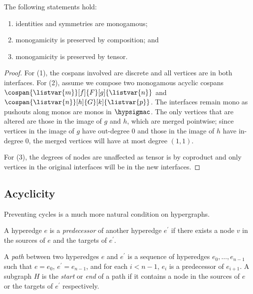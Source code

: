 \begin{lemma}
    \label{lem:monogamicity-preserved}
    The following statements hold:
    \begin{enumerate}
        \item identities and symmetries are monogamous;
        \item monogamicity is preserved by composition; and
        \item monogamicity is preserved by tensor.
    \end{enumerate}
\end{lemma}
\begin{proof}
    For (1), the cospans involved are discrete and all vertices are in both
    interfaces.
    For (2), assume we compose two monogamous acyclic cospans \(
        \cospan{\listvar{m}}[f]{F}[g]{\listvar{n}}
    \) and \(
        \cospan{\listvar{n}}[h]{G}[k]{\listvar{p}}
    \).
    The interfaces remain mono as pushouts along monos are monos in
    \(\hypsigmac\). The only vertices that are altered are those in the image of
    \(g\) and \(h\), which are merged pointwise; since vertices in the image of
    \(g\) have out-degree \(0\) and those in the image of \(h\) have in-degree
    \(0\), the merged vertices will have at most degree \((1, 1)\).

    For (3), the degrees of nodes are unaffected as tensor is by coproduct and
    only vertices in the original interfaces will be in the new interfaces.
\end{proof}

\subsection{Acyclicity}

Preventing cycles is a much more natural condition on hypergraphs.

\begin{definition}
    A hyperedge \(e\) is a \emph{predecessor} of another hyperedge \(e^\prime\)
    if there exists a node \(v\) in the sources of \(e\) and the targets of
    \(e^\prime\).
\end{definition}

\begin{definition}
    A \emph{path} between two hyperedges \(e\) and \(e^\prime\) is a sequence of
    hyperedges \(e_0, \dots, e_{n-1}\) such that \(e = e_0\),
    \(e^\prime = e_{n-1}\), and for each \(i < n-1\), \(e_i\) is a predecessor
    of \(e_{i+1}\).
    A subgraph \(H\) is the \emph{start} or \emph{end} of a path if it contains
    a node in the sources of \(e\) or the targets of \(e^\prime\) respectively.
\end{definition}

